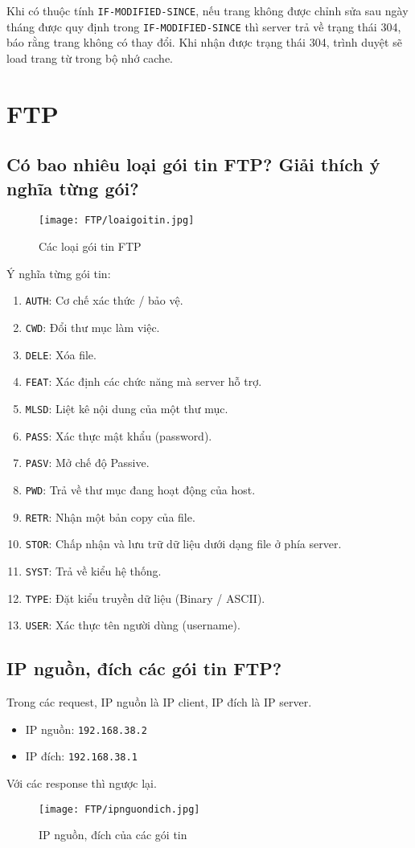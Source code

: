 \documentclass[]{article}
\begin{document}
Khi có thuộc tính \texttt{IF-MODIFIED-SINCE}, nếu trang không được chỉnh sửa sau ngày tháng được quy định trong \texttt{IF-MODIFIED-SINCE} thì server trả về trạng thái 304, báo rằng trang không có thay đổi. Khi nhận được trạng thái 304, trình duyệt sẽ load trang từ trong bộ nhớ cache.\cite{MSDN-modified}

\section{FTP}
\subsection{Có bao nhiêu loại gói tin FTP? Giải thích ý nghĩa từng gói?}
\begin{figure}[H]
\centering
\texttt{[image: FTP/loaigoitin.jpg]}
\caption{Các loại gói tin FTP}
\end{figure}
Ý nghĩa từng gói tin:\cite{packetinfo}
\begin{enumerate}
\item \texttt{AUTH}: Cơ chế xác thức / bảo vệ.
\item \texttt{CWD}: Đổi thư mục làm việc.
\item \texttt{DELE}: Xóa file.
\item \texttt{FEAT}: Xác định các chức năng mà server hỗ trợ.
\item \texttt{MLSD}: Liệt kê nội dung của một thư mục.
\item \texttt{PASS}: Xác thực mật khẩu (password).
\item \texttt{PASV}: Mở chế độ Passive.
\item \texttt{PWD}: Trả về thư mục đang hoạt động của host.
\item \texttt{RETR}: Nhận một bản copy của file.
\item \texttt{STOR}: Chấp nhận và lưu trữ dữ liệu dưới dạng file ở phía server.
\item \texttt{SYST}: Trả về kiểu hệ thống.
\item \texttt{TYPE}: Đặt kiểu truyền dữ liệu (Binary / ASCII).
\item \texttt{USER}: Xác thực tên người dùng (username).
\end{enumerate}
\subsection{IP nguồn, đích các gói tin FTP?}
Trong các request, IP nguồn là IP client, IP đích là IP server.
\begin{itemize}
\item IP nguồn: \texttt{192.168.38.2}
\item IP đích: \texttt{192.168.38.1}
\end{itemize}
Với các response thì ngược lại.
\begin{figure}[H]
\centering
\texttt{[image: FTP/ipnguondich.jpg]}
\caption{IP nguồn, đích của các gói tin}
\end{figure}
\end{document}
